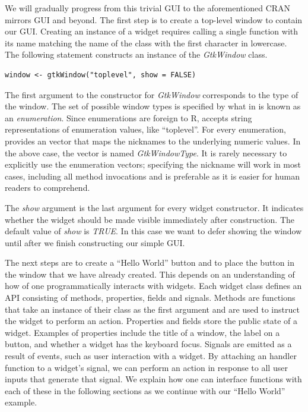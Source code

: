 \documentclass[article]{jss}
\begin{document}
We will gradually 
progress from this trivial GUI to the aforementioned CRAN mirrors GUI
and beyond.
The first step is to create a top-level window to contain our GUI.
Creating an instance of a  widget requires calling a single
function with its name matching the name of the class with the first
character in 
lowercase. The following statement constructs an instance of the
\emph{GtkWindow} class.
\begin{verbatim}
window <- gtkWindow("toplevel", show = FALSE)
\end{verbatim}

The first argument to the constructor for \emph{GtkWindow} corresponds
to the type of the window. The set of possible window types is
specified by what in  is known as an
\emph{enumeration}. Since enumerations are foreign to R, 
accepts string representations of enumeration values, like
``toplevel''. For every  enumeration,  provides
an  vector that maps the nicknames to the underlying
numeric values.  In the above case, the vector is named
\emph{GtkWindowType}. It is rarely necessary to explicitly use the
enumeration vectors; specifying the nickname will work in most cases,
including all method invocations and is preferable as it is easier for
human readers to comprehend.

The \emph{show} argument is the last argument for every widget
constructor. It
indicates whether the widget should be made visible immediately after
construction.
The default value of \emph{show} is \emph{TRUE}. In this case we want
to
defer showing the window until after we finish constructing our simple
GUI.

The next steps are to create a ``Hello World'' button and to place the
button in the window that we have already created. This depends on an
understanding of how of one programmatically interacts with widgets.
Each widget class defines an API 
consisting of methods, properties, fields and signals. Methods are
functions 
that take an instance of their class as the first argument and are
used to instruct the 
widget to perform an action. Properties and fields store the public
state of a widget. Examples of properties include the title of a
window, the label on a button, and whether a widget has the keyboard
focus. 
Signals are emitted as a result of events, such as user interaction
with a widget.
By attaching an  handler function to a widget's signal, we
can
perform an action in response to all user inputs that generate that
signal. We explain how one can interface  functions with
each of these in the following sections as we continue with our
``Hello World'' example.
\end{document}
